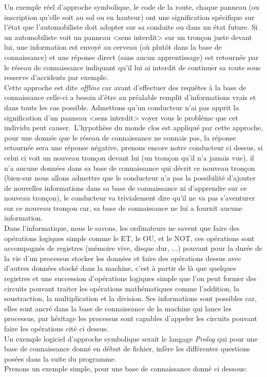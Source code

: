 Un exemple réel d'approche symbolique, le code de la route, chaque panneau (ou inscription qu'elle soit au sol ou en hauteur) ont une signification spécifique sur l'état que l'automobiliste doit adopter sur sa conduite ou dans un état future. Si un automobiliste voit un panneau <sens interdit> sur un tronçon juste devant lui, une information est envoyé au cerveau (où plutôt dans la base de connaissance) et une réponse direct (sans aucun apprentissage) est retournée par le réseau de connaissance indiquant qu'il lui ai interdit de continuer sa route sous resserve d'accidents par exemple.\\
Cette approche est dite \textit{offline}  car avant d'effectuer des requêtes à la base de connaissance celle-ci a besoin d'être au préalable remplit d'informations vrais et dans touts les cas possible. Admettons qu'un conducteur n'ai pas apprit la signification d'un panneau <sens interdit> voyer vous le problème que cet individu peut causer.\ L'hypothèse du monde clos est appliqué par cette approche, pour une donnée que le réseau de connaissance ne connais pas, la réponse retournée sera une réponse négative, prenons encore notre conducteur ci dessus, si celui ci voit un nouveau tronçon devant lui (un tronçon qu'il n'a jamais vue), il n'a aucune données dans sa base de connaissance qui décrit ce nouveau tronçon (bien-sur nous allons admettre que le conducteur n'a pas la possibilité d'ajouter de nouvelles informations dans sa base de connaissance ni d'apprendre sur ce nouveau tronçon), le conducteur va trivialement dire qu'il ne va pas s'aventurer sur ce nouveau tronçon car, sa base de connaissance ne lui a fournit aucune information. \\
\linebreak
Dans l'informatique, nous le savons, les ordinateurs ne savent que faire des opérations logiques simple comme le ET, le OU, et le NOT, ces opérations sont accompagnés de registres (mémoire vive, disque dur, ...) pouvant pour la durée de la vie d'un processus stocker les données et faire des opérations dessus avec d'autres données stocké dans la machine, c'est à partir de là que quelques registres et une succession d'opérations logiques simple que l'on peut former des circuits pouvant traiter les opérations mathématiques comme l'addition, la soustraction, la multiplication et la division. Ses informations sont possibles car, elles sont ancré dans la base de connaissance de la machine qui lance les processus, par héritage les processus sont capables d'appeler les circuits pouvant faire les opérations cité ci dessus. \\ Un exemple logiciel d'approche symbolique serait le langage \textit{Prolog} qui pour une base de connaissance donné en début de fichier, infère les différentes questions posées dans la suite du programme.\\ Prenons un exemple simple, pour une base de connaissance donné ci dessous:
